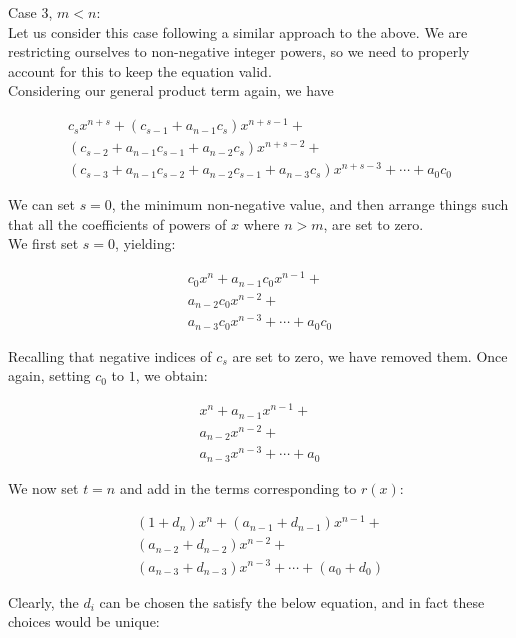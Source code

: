 Case 3,  $m < n$: \\

Let us consider this case following a similar approach to the above.  We are restricting ourselves to non-negative integer powers, so we need to properly account for this to keep the equation valid.\\

Considering our general product term again, we have

\begin{multline}
c_{s}x^{n+s}+ (c_{s-1}+a_{n-1}c_{s} ) x^{n+s-1} + \\ (c_{s-2}+a_{n-1}c_{s-1}+a_{n-2}c_{s} ) x^{n+s-2} +\\ (c_{s-3}+a_{n-1}c_{s-2}+a_{n-2}c_{s-1}+ a_{n-3}c_{s} ) x^{n+s-3} + \cdots + a_{0}c_{0}
\end{multline}

We can set $s=0$, the minimum non-negative value, and then arrange things such that all the coefficients of powers of $x$ where $n > m$, are set to zero.\\

We first set $s=0$, yielding:

\begin{multline}
c_{0}x^{n}+ a_{n-1}c_{0}  x^{n-1} + \\ a_{n-2}c_{0}  x^{n-2} +\\ a_{n-3}c_{0} x^{n-3} + \cdots + a_{0}c_{0}
\end{multline}

Recalling that negative indices of $c_{s}$ are set to zero, we have removed them.  Once again, setting $c_{0}$ to $1$, we obtain:

\begin{multline}
x^{n}+ a_{n-1}  x^{n-1} + \\ a_{n-2} x^{n-2} +\\ a_{n-3} x^{n-3} + \cdots + a_{0}
\end{multline}

We now set $t=n$ and add in the terms corresponding to $r(x)$:

\begin{multline}
(1+d_{n})x^{n}+ (a_{n-1}+d_{n-1})  x^{n-1} + \\ (a_{n-2}+d_{n-2}) x^{n-2} +\\ (a_{n-3}+d_{n-3}) x^{n-3} + \cdots + (a_{0}+d_{0})
\end{multline}

Clearly, the $d_{i}$ can be chosen the satisfy the below equation, and in fact these choices would be unique:

